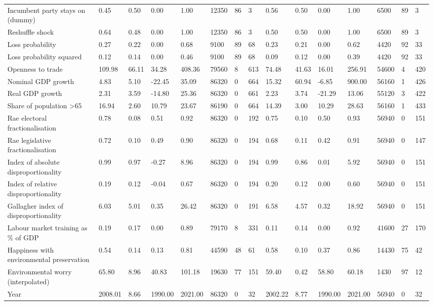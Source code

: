 \begin{longtable}{lllllllllllllll}
Incumbent party stays on (dummy) & 0.45 & 0.50 & 0.00 & 1.00 & 12350 & 86 & 3 & 0.56 & 0.50 & 0.00 & 1.00 & 6500 & 89 & 3\\
Reshuffle shock & 0.64 & 0.48 & 0.00 & 1.00 & 12350 & 86 & 3 & 0.50 & 0.50 & 0.00 & 1.00 & 6500 & 89 & 3\\
\addlinespace
Loss probability & 0.27 & 0.22 & 0.00 & 0.68 & 9100 & 89 & 68 & 0.23 & 0.21 & 0.00 & 0.62 & 4420 & 92 & 33\\
Loss probability squared & 0.12 & 0.14 & 0.00 & 0.46 & 9100 & 89 & 68 & 0.09 & 0.12 & 0.00 & 0.39 & 4420 & 92 & 33\\
Openness to trade & 109.98 & 66.11 & 34.28 & 408.36 & 79560 & 8 & 613 & 74.48 & 41.63 & 16.01 & 256.91 & 54600 & 4 & 420\\
Nominal GDP growth & 4.83 & 5.10 & -22.45 & 35.09 & 86320 & 0 & 664 & 15.32 & 60.94 & -6.85 & 900.00 & 56160 & 1 & 426\\
Real GDP growth & 2.31 & 3.59 & -14.80 & 25.36 & 86320 & 0 & 661 & 2.23 & 3.74 & -21.29 & 13.06 & 55120 & 3 & 422\\
\addlinespace
Share of population >65 & 16.94 & 2.60 & 10.79 & 23.67 & 86190 & 0 & 664 & 14.39 & 3.00 & 10.29 & 28.63 & 56160 & 1 & 433\\
Rae electoral fractionalisation & 0.78 & 0.08 & 0.51 & 0.92 & 86320 & 0 & 192 & 0.75 & 0.10 & 0.50 & 0.93 & 56940 & 0 & 151\\
Rae legislative fractionalisation & 0.72 & 0.10 & 0.49 & 0.90 & 86320 & 0 & 194 & 0.68 & 0.11 & 0.42 & 0.91 & 56940 & 0 & 147\\
Index of absolute disproportionality & 0.99 & 0.97 & -0.27 & 8.96 & 86320 & 0 & 194 & 0.99 & 0.86 & 0.01 & 5.92 & 56940 & 0 & 151\\
Index of relative disproportionality & 0.19 & 0.12 & -0.04 & 0.67 & 86320 & 0 & 194 & 0.20 & 0.12 & 0.00 & 0.60 & 56940 & 0 & 151\\
\addlinespace
Gallagher index of disproportionality & 6.03 & 5.01 & 0.35 & 26.42 & 86320 & 0 & 191 & 6.58 & 4.57 & 0.32 & 18.92 & 56940 & 0 & 151\\
Labour market training as \% of GDP & 0.19 & 0.17 & 0.00 & 0.89 & 79170 & 8 & 331 & 0.11 & 0.14 & 0.00 & 0.92 & 41600 & 27 & 170\\
Happiness with environmental preservation & 0.54 & 0.14 & 0.13 & 0.81 & 44590 & 48 & 61 & 0.58 & 0.10 & 0.37 & 0.86 & 14430 & 75 & 42\\
Environmental worry (interpolated) & 65.80 & 8.96 & 40.83 & 101.18 & 19630 & 77 & 151 & 59.40 & 0.42 & 58.80 & 60.18 & 1430 & 97 & 12\\
Year & 2008.01 & 8.66 & 1990.00 & 2021.00 & 86320 & 0 & 32 & 2002.22 & 8.77 & 1990.00 & 2021.00 & 56940 & 0 & 32\\
\bottomrule
\end{longtable}
